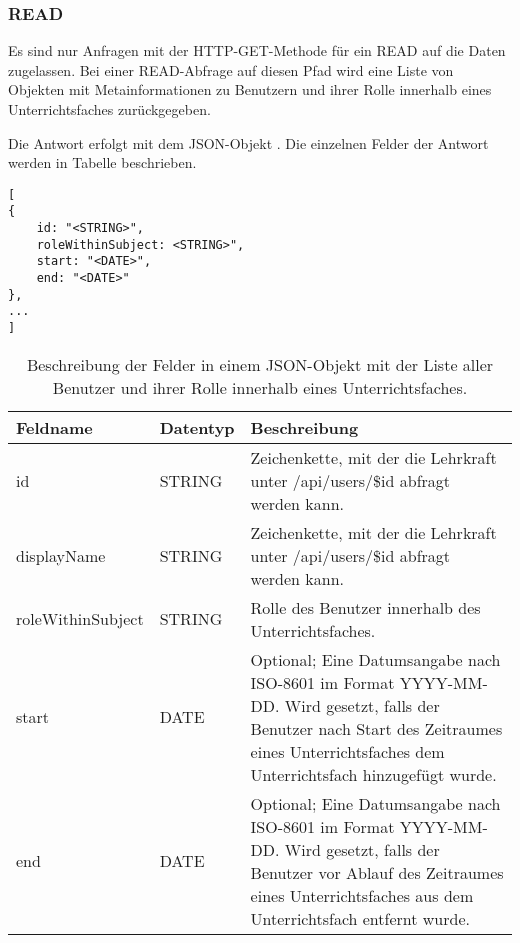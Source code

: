 \subsubsection{READ}
\label{secrest:api:subjects:id:users:read}
Es sind nur Anfragen mit der HTTP-GET-Methode für ein READ auf die Daten zugelassen.
Bei einer READ-Abfrage auf diesen Pfad wird eine Liste von Objekten mit Metainformationen zu Benutzern und ihrer Rolle innerhalb eines Unterrichtsfaches zurückgegeben.

Die Antwort erfolgt mit dem JSON-Objekt . 
Die einzelnen Felder der Antwort werden in Tabelle  beschrieben.

\begin{lstlisting}[caption={JSON-Antwort für einen GET-Aufruf des Pfads /api/subjects/\$id/users},label={lst:code:rest:api:subjects:id:users:read:ret},frame=tlrb]
[
{
    id: "<STRING>",
    roleWithinSubject: <STRING>",
    start: "<DATE>",
    end: "<DATE>"    
},
...
]
\end{lstlisting}
\begin{longtable}{|p{}|p{}|p{}|}
		\caption{Beschreibung der Felder in einem JSON-Objekt mit der Liste aller Benutzer und ihrer Rolle innerhalb eines Unterrichtsfaches.}
\endfoot
		\caption{Beschreibung der Felder in einem JSON-Objekt mit der Liste aller Benutzer und ihrer Rolle innerhalb eines Unterrichtsfaches.}
		\label{tab:rest:api:subjects:id:users:read:ret:json}
\endlastfoot 
\hline
			\textbf{Feldname} & \textbf{Datentyp} & \textbf{Beschreibung} \\ \hline
\endhead
id & STRING & Zeichenkette, mit der die Lehrkraft unter /api/users/\$id abfragt werden kann. \\ \hline
displayName & STRING &  Zeichenkette, mit der die Lehrkraft unter /api/users/\$id abfragt werden kann. \\ \hline
roleWithinSubject & STRING & Rolle des Benutzer innerhalb des Unterrichtsfaches. \\ \hline
start & DATE & Optional; Eine Datumsangabe nach ISO-8601 im Format YYYY-MM-DD. Wird gesetzt, falls der Benutzer nach Start des Zeitraumes eines Unterrichtsfaches dem Unterrichtsfach hinzugefügt wurde. \\ \hline
end & DATE & Optional; Eine Datumsangabe nach ISO-8601 im Format YYYY-MM-DD. Wird gesetzt, falls der Benutzer vor Ablauf des Zeitraumes eines Unterrichtsfaches aus dem Unterrichtsfach entfernt wurde. \\ \hline
\end{longtable}
